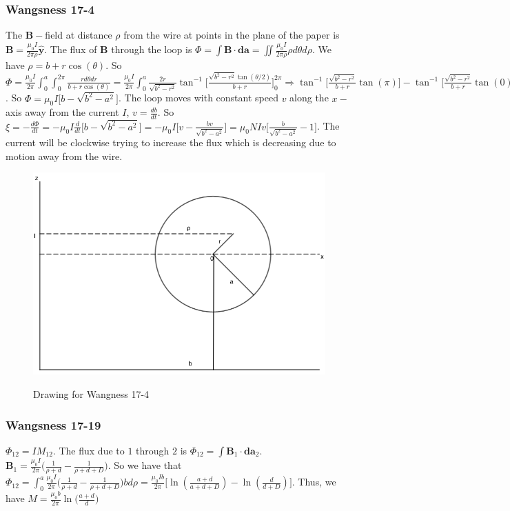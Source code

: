 \documentclass{article}
\theoremstyle{mystyle}
\begin{document}
\subsubsection{Wangsness 17-4}
The $\mathbf{B}-$field at distance $\rho$ from the wire at points in the plane of the paper is $\mathbf{B} = \frac{\mu_0 I}{2\pi \rho} \hat{\mathbf{y}}$. The flux of $\mathbf{B}$ through the loop is $\Phi = \int \mathbf{B}\cdot \mathbf{da} = \iint \frac{\mu_0 I}{2\pi \rho}\rho d\theta d\rho$. We have $\rho = b+r\cos(\theta)$. So $\Phi = \frac{\mu_0 I}{2\pi} \int_{0}^{a} \int_{0}^{2\pi} \frac{r d\theta dr}{b+r\cos(\theta)} = \frac{\mu_0 I}{2\pi} \int_{0}^{a} \frac{2r}{\sqrt{b^2-r^2}}\tan^{-1}\big[\frac{\sqrt{b^2-r^2}\tan(\theta/2)}{b+r}\big]_{0}^{2\pi} \Rightarrow \tan^{-1}\big[\frac{\sqrt{b^2-r^2}}{b+r}\tan(\pi)\big] - \tan^{-1}\big[ \frac{\sqrt{b^2-r^2}}{b+r}\tan(0)\big]$. So $\Phi = \mu_0 I\big[b-\sqrt{b^2-a^2}\big]$. The loop moves with constant speed $v$ along the $x-$axis away from the current $I$, $v = \frac{db}{dt}$. So $\xi = -\frac{d\Phi}{dt} = -\mu_0 I \frac{d}{dt}\big[b-\sqrt{b^2-a^2}\big] = -\mu_0 I\big[ v-\frac{bv}{\sqrt{b^2-a^2}}\big] = \mu_0 NIv\big[ \frac{b}{\sqrt{b^2-a^2}}-1\big]$. The current will be clockwise trying to increase the flux which is decreasing due to motion away from the wire.
\begin{figure}[htbp]
    \centering
    {\includegraphics[scale=0.4]{17-4.png}}
    \caption{Drawing for Wangness 17-4}
\end{figure}
\subsubsection{Wangsness 17-19}
$\Phi_{12} = IM_{12}$. The flux due to $1$ through $2$ is $\Phi_{12} = \int \mathbf{B}_1 \cdot \mathbf{da}_2$. $\mathbf{B}_1 = \frac{\mu_0 I}{2\pi} \big( \frac{1}{\rho+d}- \frac{1}{\rho+d+D}\big)$. So we have that $\Phi_{12} = \int_{0}^{a} \frac{\mu_0 I}{2\pi} \big(\frac{1}{\rho+d}- \frac{1}{\rho+d+D}\big) bd\rho = \frac{\mu_0 Ib}{2\pi}\big[ \ln(\frac{a+d}{a+d+D}) - \ln(\frac{d}{d+D})\big]$. Thus, we have $M = \frac{\mu_0 b}{2\pi} \ln\big(\frac{a+d}{d}\big)$
\end{document}
